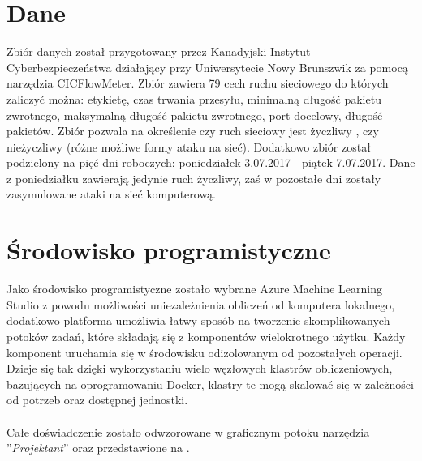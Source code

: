 \section{Dane}
Zbiór danych został przygotowany przez Kanadyjski Instytut Cyberbezpieczeństwa działający przy Uniwersytecie Nowy Brunszwik za pomocą narzędzia CICFlowMeter\cite{Ahlashkari2022}. Zbiór zawiera 79 cech ruchu sieciowego do których zaliczyć można: etykietę, czas trwania przesyłu, minimalną długość pakietu zwrotnego, maksymalną długość pakietu zwrotnego, port docelowy, długość pakietów. Zbiór pozwala na określenie czy ruch sieciowy jest życzliwy , czy nieżyczliwy (różne możliwe formy ataku na sieć). Dodatkowo zbiór został podzielony na pięć dni roboczych: poniedziałek 3.07.2017 - piątek 7.07.2017. Dane z poniedziałku zawierają jedynie ruch życzliwy, zaś w pozostałe dni zostały zasymulowane ataki na sieć komputerową\cite{Blyszcz2022, unbkaggle}.

\section{Środowisko programistyczne}
Jako środowisko programistyczne zostało wybrane Azure Machine Learning Studio z powodu możliwości uniezależnienia obliczeń od komputera lokalnego, dodatkowo platforma umożliwia łatwy sposób na tworzenie skomplikowanych potoków zadań, które składają się z komponentów wielokrotnego użytku. Każdy komponent uruchamia się w środowisku odizolowanym od pozostałych operacji. Dzieje się tak dzięki wykorzystaniu wielo węzłowych klastrów obliczeniowych, bazujących na oprogramowaniu Docker, klastry te mogą skalować się w zależności od potrzeb oraz dostępnej jednostki\cite{MicrosoftLearn2023}.
\\ \\
Całe doświadczenie zostało odwzorowane w graficznym potoku narzędzia ''\textit{Projektant}'' oraz przedstawione na .

